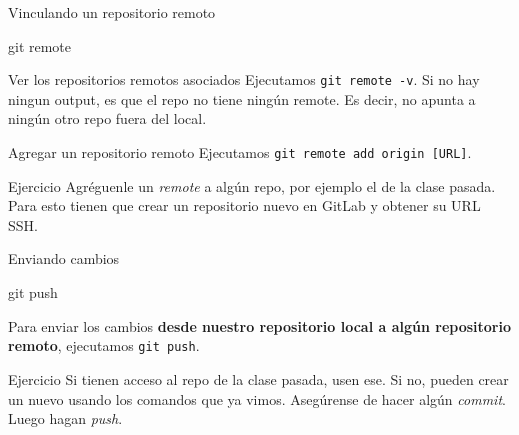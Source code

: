 \begin{frame}[t]{Vinculando un repositorio remoto}
    \begin{comando}
        git remote
    \end{comando}

    \vspace{0.5em}
    \pause
    \begin{block}{Ver los repositorios remotos asociados}
        Ejecutamos \texttt{git remote -v}. Si no hay ningun output, es que el repo no tiene ningún remote. Es decir, no apunta a ningún otro repo fuera del local.
    \end{block}

    \pause
    \begin{block}{Agregar un repositorio remoto}
        Ejecutamos \texttt{git remote add origin [URL]}. %
    \end{block}

    \begin{ejercicio}{Ejercicio}
        Agréguenle un \textit{remote} a algún repo, por ejemplo el de la clase pasada. Para esto tienen que crear un repositorio nuevo en GitLab y obtener su URL SSH.
    \end{ejercicio}
\end{frame}

\begin{frame}[t]{Enviando cambios}
    \begin{comando}
        git push
    \end{comando}

    \pause
    \begin{block}{}
        Para enviar los cambios \textbf{desde nuestro repositorio local a algún
        repositorio remoto}, ejecutamos \texttt{git push}.
    \end{block}

    \begin{ejercicio}{Ejercicio}
        Si tienen acceso al repo de la clase pasada, usen ese. Si no, pueden crear un nuevo usando los comandos que ya vimos. Asegúrense de hacer algún \textit{commit}. Luego hagan \textit{push}. 
    \end{ejercicio}
\end{frame}


